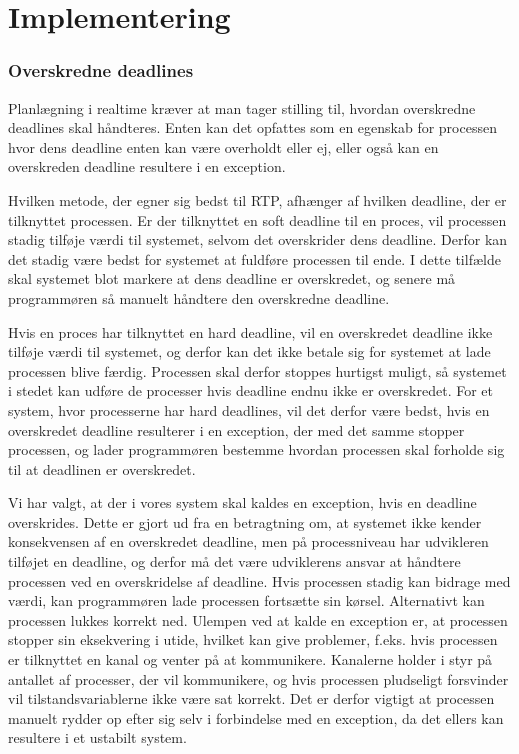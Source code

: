 \section{Implementering}\label{sec:deadline-implementation}
\subsubsection{Overskredne deadlines}
Planlægning i realtime kræver at man tager stilling til, hvordan  overskredne deadlines skal håndteres. Enten kan det opfattes som en egenskab for processen hvor dens deadline enten kan være overholdt eller ej, eller også kan en overskreden deadline resultere i en exception.

Hvilken metode, der egner sig bedst til RTP, afhænger af hvilken deadline, der er tilknyttet processen. Er der tilknyttet en soft deadline til en proces, vil processen stadig tilføje værdi til systemet, selvom det overskrider dens deadline. Derfor kan det stadig være bedst for systemet at fuldføre processen til ende. I dette tilfælde  skal systemet blot markere at dens deadline er overskredet, og senere må programmøren så manuelt håndtere den overskredne deadline. 

Hvis en proces har tilknyttet  en hard deadline, vil en overskredet deadline ikke tilføje værdi til systemet, og derfor kan det ikke betale sig for systemet at lade processen blive færdig. Processen skal derfor stoppes hurtigst muligt, så systemet i stedet kan udføre de processer hvis deadline endnu ikke er overskredet. For et system, hvor processerne har hard deadlines, vil det derfor være bedst, hvis en overskredet deadline resulterer i en exception, der med det samme stopper processen, og lader programmøren bestemme hvordan processen skal forholde sig til at deadlinen er overskredet.

Vi har valgt, at der i vores system skal kaldes en exception, hvis en deadline overskrides. Dette er gjort ud fra en betragtning om, at systemet ikke kender konsekvensen af en overskredet deadline, men på processniveau har udvikleren tilføjet en deadline, og derfor må det være udviklerens ansvar at håndtere processen ved en overskridelse af deadline.  Hvis processen stadig kan bidrage med værdi, kan programmøren lade processen fortsætte sin kørsel. Alternativt kan processen lukkes korrekt ned. Ulempen ved at kalde en exception er, at processen stopper sin eksekvering i utide, hvilket kan give problemer, f.eks. hvis processen er tilknyttet en kanal og venter på at kommunikere.  Kanalerne holder i \pycsp styr på antallet af processer, der vil kommunikere, og hvis processen pludseligt forsvinder vil tilstandsvariablerne ikke være sat korrekt. Det er derfor vigtigt at processen manuelt rydder op efter sig selv i forbindelse med en exception, da det ellers kan resultere i et ustabilt system.

